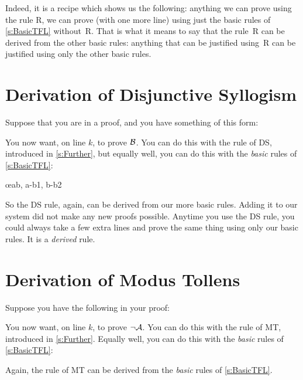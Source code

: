 Indeed, it is a recipe which shows us the following: anything we can prove using the rule R, we can prove (with one more line) using just the basic rules of \cref{s:BasicTFL} without~R. That is what it means to say that the rule~R can be derived from the other basic rules: anything that can be justified using~R can be justified using only the other basic rules.


\section{Derivation of Disjunctive Syllogism}
Suppose that you are in a proof, and you have something of this form:
\begin{fitchproof}
\end{fitchproof}
You now want, on line $k$, to prove $\mathcal{B}$. You can do this with the rule of DS, introduced in \cref{s:Further}, but equally well, you can do this with the \emph{basic} rules of \cref{s:BasicTFL}:
	\begin{fitchproof}
		\open
			\AS
		\close
		\open
			\AS
		\close
	\oe{ab, a-b1, b-b2}
\end{fitchproof}
So the DS rule, again, can be derived from our more basic rules. Adding it to our system did not make any new proofs possible. Anytime you use the DS rule, you could always take a few extra lines and prove the same thing using only our basic rules. It is a \emph{derived} rule.

\section{Derivation of Modus Tollens}
Suppose you have the following in your proof:
\begin{fitchproof}
\end{fitchproof}
You now want, on line $k$, to prove $\neg \mathcal{A}$. You can do this with the rule of MT, introduced in \cref{s:Further}. Equally well, you can do this with the \emph{basic} rules of \cref{s:BasicTFL}:
\begin{fitchproof}
		\open
		\AS
		\close
\end{fitchproof}
Again, the rule of MT can be derived from the \emph{basic} rules of \cref{s:BasicTFL}.

